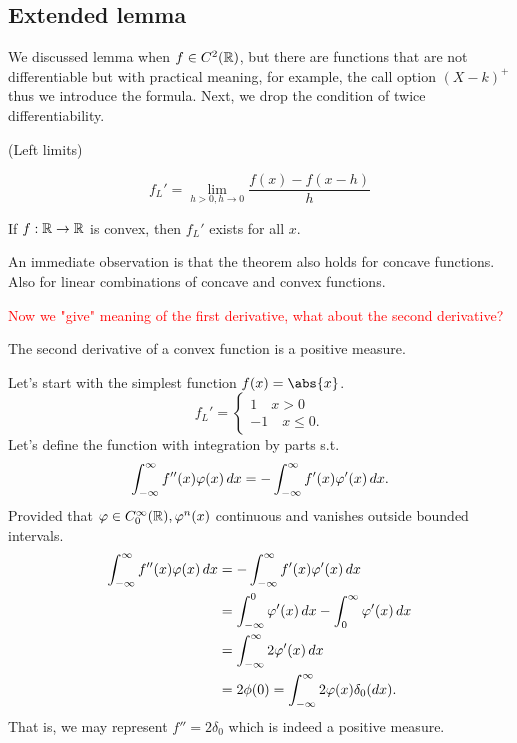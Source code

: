 \subsection{Extended \ito lemma}

We discussed \ito lemma when $f\in C^2(\mathbb{R})$, but there are functions that are not differentiable but with practical meaning, for example, the call option $(X-k)^+$ thus we introduce the \itm formula. Next, we drop the condition of twice differentiability.

\begin{dfn}{(Left limits)} 

\begin{equation*}
    f_L' = \lim_{h>0, h\rightarrow 0} \frac{f(x) - f(x-h)}{h}
\end{equation*}
\end{dfn}

\begin{thm}
If $f: \mathbb{R} \rightarrow \mathbb{R}$ is convex, then $f_L'$ exists for all $x$.
\end{thm}

An immediate observation is that the theorem also holds for concave functions. Also for linear combinations of concave and convex functions.

\textcolor{red}{Now we "give" meaning of the first derivative, what about the second derivative?}

\begin{thm}
The second derivative of a convex function is a positive measure.
\end{thm}

\begin{example}
Let's start with the simplest function $f(x) = \abs{x}$.
\begin{equation*}
    f_L' = \begin{cases}
    1 \quad x>0 \\
    -1 \quad x \leq 0.
    \end{cases}
\end{equation*}Let's define the function with integration by parts s.t.
\begin{equation*}
    \int_{-\infty}^\infty  f''(x)\varphi(x) \mathop{}\!d x = -\int_{-\infty}^\infty f'(x)\varphi'(x) \mathop{}\!d x.
\end{equation*}
Provided that $\varphi \in C_0^\infty(\mathbb{R}), \varphi^{n}(x)$ continuous and vanishes outside bounded intervals.
\begin{align*}
    \int_{-\infty}^\infty  f''(x)\varphi(x) \mathop{}\!d x &= -\int_{-\infty}^\infty f'(x)\varphi'(x) \mathop{}\!d x\\
    &= \int_{-\infty}^0 \varphi'(x) \mathop{}\!d x-\int_{0}^\infty  \varphi'(x) \mathop{}\!d x\\
    &= \int_{-\infty}^\infty  2\varphi'(x) \mathop{}\!d x \\
    &= 2\phi(0) = \int_{-\infty}^\infty  2\varphi(x) \delta_0(\mathop{}\!d x).
\end{align*}
That is, we may represent $f'' = 2\delta_0$ which is indeed a positive measure.
\end{example}


